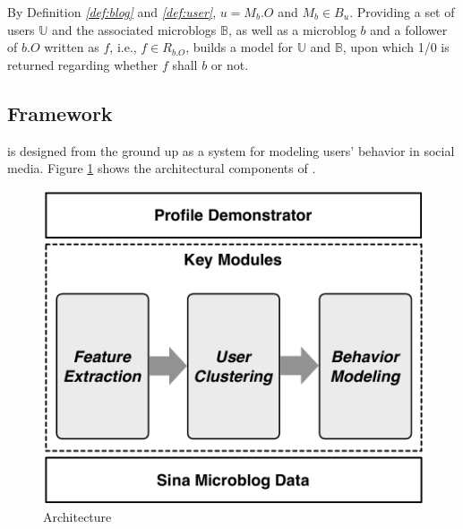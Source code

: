 By Definition \textit{\ref{def:blog}} and \textit{\ref{def:user}}, $u = M_b.O$ and $M_b \in B_u$.
%
Providing a set of users $\mathbb{U}$ and the associated microblogs $\mathbb{B}$, as well as a microblog $b$ and a follower of $b.O$ written as $f$, i.e., $f \in R_{b.O}$, \sys{} builds a \retg{} model for $\mathbb{U}$ and $\mathbb{B}$, upon which 1/0 is returned regarding whether $f$ shall \ret{} $b$ or not.


\subsection{\sys{} Framework}
\sys{} is designed from the ground up as a system for modeling users' \retg{} behavior in social media.
Figure \ref{fig:framework} shows the architectural components of \sys{}. %

\begin{figure}[tb!]
\centering
\includegraphics[width=.67\linewidth]{figures/architecture.pdf}
\vspace{-1ex}
\caption{\sys{} Architecture}
\label{fig:framework}
\vspace{-4ex}
\end{figure}

